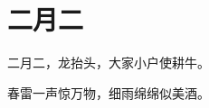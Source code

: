 \documentclass[12pt,UTF-8,openany]{ctexbook}
\begin{document}
\clearpage

\begin{center}
    
\end{center}


\hanzibox{}\hanzibox{}\hanzibox{}\hanzibox{}\hspace{1em}\hanzibox{}\hanzibox{}\hanzibox{}\hanzibox{}

\hanzibox{}\hanzibox{}\hanzibox{}\hanzibox{}\hspace{1em}\hanzibox{}\hanzibox{}\hanzibox{}\hanzibox{}

\hanzibox{}\hanzibox{}\hanzibox{}\hanzibox{}\hspace{1em}




\chapter{二月二}

\begin{large}
    
    二月二，龙抬头，大家小户使耕牛。
    
    春雷一声惊万物，细雨绵绵似美酒。
    
\end{large}


\clearpage

\begin{center}
    
    
    
\end{center}


\hanzibox{}\hanzibox{}\hanzibox{}\hanzibox{}\hspace{1em}\hanzibox{}\hanzibox{}\hanzibox{}\hanzibox{}

\hanzibox{}\hanzibox{}\hanzibox{}\hanzibox{}\hspace{1em}\hanzibox{}\hanzibox{}\hanzibox{}\hanzibox{}

\hanzibox{}\hanzibox{}\hanzibox{}\hanzibox{}\hspace{1em}\hanzibox{}\hanzibox{}\hanzibox{}\hanzibox{}

\hanzibox{}\hanzibox{}\hanzibox{}\hanzibox{}\hspace{1em}
\end{document}

